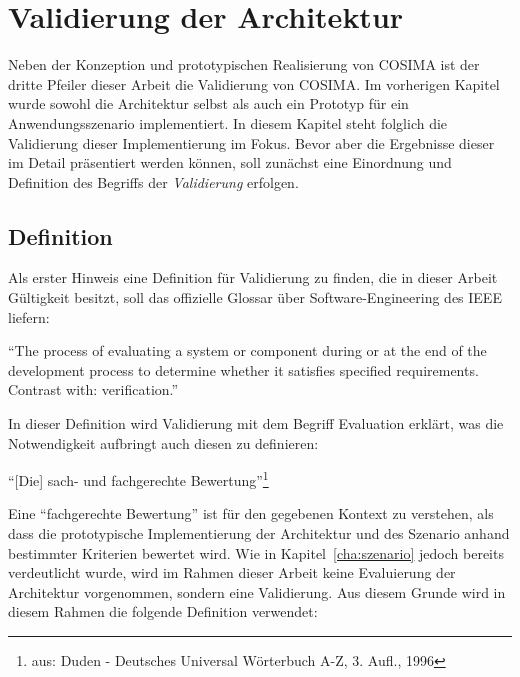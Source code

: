 
\chapter{Validierung der Architektur} %
\label{cha:validierung_der_architektur}

  Neben der Konzeption und prototypischen Realisierung von COSIMA ist der dritte Pfeiler dieser Arbeit die Validierung von COSIMA. Im vorherigen Kapitel wurde sowohl die Architektur selbst als auch ein Prototyp für ein Anwendungsszenario implementiert. In diesem Kapitel steht folglich die Validierung dieser Implementierung im Fokus. Bevor aber die Ergebnisse dieser im Detail präsentiert werden können, soll zunächst eine Einordnung und Definition des Begriffs der \emph{Validierung} erfolgen.

\section{Definition} %
\label{sec:definition_validierung}
  
  Als erster Hinweis eine Definition für Validierung zu finden, die in dieser Arbeit Gültigkeit besitzt, soll das offizielle Glossar über Software-Engineering des IEEE liefern:

  \begin{definition}\label{def:validierung_ieee}
    "`The process of evaluating a system or component during or at the end of the development process to determine whether it satisfies specified requirements. Contrast with: verification."'~\emph{\citep{ieee90sg}}
  \end{definition}
  
  In dieser Definition wird Validierung mit dem Begriff Evaluation erklärt, was die Notwendigkeit aufbringt auch diesen zu definieren:
  
  \begin{definition}[Evaluation]\label{def:evaluation}
    "`[Die] sach- und fachgerechte Bewertung"'\footnote{aus: Duden - Deutsches Universal Wörterbuch A-Z, 3. Aufl., 1996}
  \end{definition}
  
  Eine "`fachgerechte Bewertung"' ist für den gegebenen Kontext zu verstehen, als dass die prototypische Implementierung der Architektur und des Szenario anhand bestimmter Kriterien bewertet wird. Wie in Kapitel~\ref{cha:szenario} jedoch bereits verdeutlicht wurde, wird im Rahmen dieser Arbeit keine Evaluierung der Architektur vorgenommen, sondern eine Validierung. Aus diesem Grunde wird in diesem Rahmen die folgende Definition verwendet:
  
